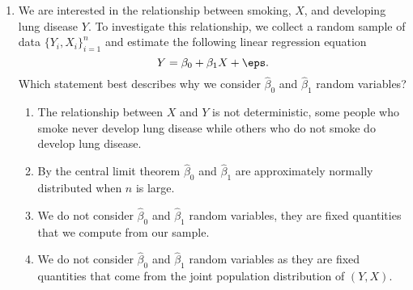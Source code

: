 \documentclass[10pt]{article}
\begin{document}
\begin{enumerate}
	\item We are interested in the relationship between smoking, \(X\), and  developing lung disease \(Y\). To investigate this relationship, we collect a random sample of data  \(\{Y_i,X_i\}_{i=1}^n\) and estimate the following linear regression equation \[Y = \beta_0 + \beta_1X +\eps.\] Which statement best describes why we consider \(\hat\beta_0\) and  \(\hat\beta_1\) random variables?
	 \begin{enumerate}
		\item The relationship between \(X\) and  \(Y\) is not deterministic, some people who smoke never develop lung disease while others who do not smoke do develop lung disease.
		\item By the central limit theorem \(\hat\beta_0\) and  \(\hat\beta_1\) are approximately normally distributed when  \(n\) is large.  
		\item We do not consider \(\hat\beta_0\) and  \(\hat\beta_1\) random variables, they are fixed quantities that we compute from our sample.
		\item We do not consider \(\hat\beta_0\) and  \(\hat\beta_1\) random variables as they are fixed quantities that come from the joint population distribution of  \((Y,X)\).
	\end{enumerate}
	 


\end{enumerate}
\end{document}
